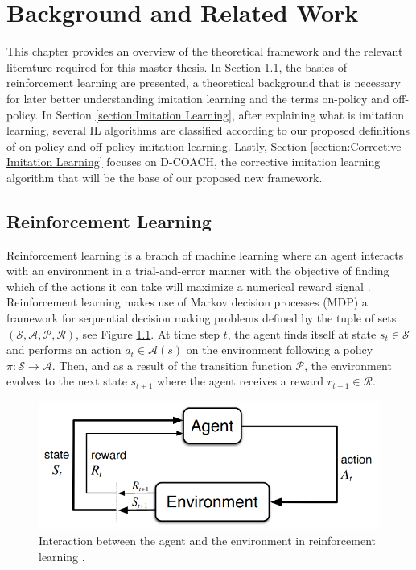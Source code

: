 \chapter{Background and Related Work}
\label{chapter:Theoretical Framework and Related Work}



This chapter provides an overview of the theoretical framework and the relevant literature required for this master thesis. In Section \ref{section:Reinforcement Learning}, the basics of reinforcement learning are presented, a theoretical background that is necessary for later better understanding imitation learning and the terms on-policy and off-policy. In Section \ref{section:Imitation Learning}, after explaining what is imitation learning, several IL algorithms are classified according to our proposed definitions of on-policy and off-policy imitation learning. Lastly, Section \ref{section:Corrective Imitation Learning} focuses on D-COACH, the corrective imitation learning algorithm that will be the base of our proposed new framework.




\section{Reinforcement Learning}
\label{section:Reinforcement Learning}

Reinforcement learning is a branch of machine learning where an agent interacts with an environment in a trial-and-error manner with the objective of finding which of the actions it can take will maximize a numerical reward signal \cite{Sutton:1998}. Reinforcement learning makes use of Markov decision processes (MDP) a framework for sequential decision making problems defined by the tuple of sets $(\mathcal{S}, \mathcal{A}, \mathcal{P}, \mathcal{R})$, see Figure \ref{fig:reinforcement_learning}. At time step $t$, the agent finds itself at state $s_t \in \mathcal{S}$ and performs an action $a_t \in \mathcal{A}(s)$ on the environment following a policy $\pi: \mathcal{S} \rightarrow \mathcal{A}$. Then, and as a result of the transition function $\mathcal{P}$, the environment evolves to the next state $s_{t+1}$ where the agent receives a reward $r_{t+1} \in \mathcal{R}$. 

\begin{figure}[H]
    \centering
    \includegraphics[width=.7\textwidth]{figures/reinforcement_learning.png}
    \caption{Interaction between the agent and the environment in reinforcement learning \cite{Sutton:1998}.}
    \label{fig:reinforcement_learning}
\end{figure}

